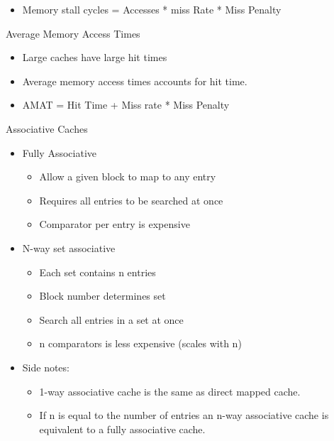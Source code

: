 \documentclass{report}
\begin{document}
\begin{description}
\begin{itemize}
            \item Memory stall cycles = Accesses * miss Rate * Miss Penalty
        \end{itemize}
    \item {\large Average Memory Access Times}
        \begin{itemize}
            \item Large caches have large hit times
            \item Average memory access times accounts for hit
                time.
            \item AMAT = Hit Time + Miss rate * Miss Penalty
        \end{itemize}
    \item {\large Associative Caches}
        \begin{itemize}
            \item Fully Associative
                \begin{itemize}
                    \item Allow a given block to map to any
                        entry
                    \item Requires all entries to be searched
                        at once
                    \item Comparator per entry is expensive
                \end{itemize}
            \item N-way set associative
                \begin{itemize}
                    \item Each set contains n entries
                    \item Block number determines set
                    \item Search all entries in a set at once
                    \item n comparators is less expensive (scales with n)
                \end{itemize}
            \item Side notes:
                \begin{itemize}
                    \item 1-way associative cache is the same
                        as direct mapped cache.
                    \item If n is equal to the number of entries
                        an n-way associative cache is equivalent
                        to a fully associative cache.
                \end{itemize}

\end{itemize}
\end{description}
\end{document}
